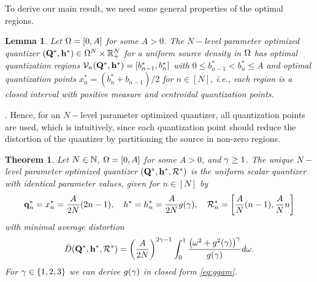 \documentclass[smallabstract,smallcaptions]{dccpaper}
\newtheorem{lemma}{Lemma}
\newtheorem{theorem}{Theorem}
\newif\ifarxiv\arxivfalse
\newenvironment{remark}{\par\vspace{1.5ex}\noindent{\em Remark\/}.}{\par\vspace{1.5ex}}
\renewcommand{\vp}{\mathbf q}
\renewcommand{\vP}{\mathbf Q}
\newcommand{\Vor}{\ensuremath{\mathcal{V}}}         %
\newcommand{\Rset}{\ensuremath{\mathcal R}}
\newcommand{\Dis}{\ensuremath{D}}                    %
\newcommand{\AvDis}{\ensuremath{\bar{\Dis}}}         %
\newcommand{\philippstart}{\color{black}}
\begin{document}
\newcommand{\pGlob}{\ensuremath{x^{*}}}
\newcommand{\hGlob}{\ensuremath{h^{*}}}
\newcommand{\qGlob}{\ensuremath{{\mathbf q}^{*}}}
\newcommand{\qLoc}{\ensuremath{{\mathbf q}^{*}}}
%
%
\philippstart
%
%
\color{black}
To derive our main result, we need some general properties of the optimal regions. 
%
\philippstart
%
\begin{lemma}\label{lemma:allActive}
  Let $\Omega=[0,A]$ for some $A>0$. The $N-$level parameter optimized quantizer $(\vP^*,\vh^*)\in\Ome^N\times\R_+^N$ for a
  uniform source density in $\Omega$ has optimal quantization regions $\Vor_n(\vP^*,\vh^*)=[b^*_{n-1},b^*_n]$ with $0\leq
  b^*_{n-1}<b^*_n\leq A$ and optimal quantization points $x_n^*=(b_n^*+b_{n-1})/2$ for $n\in[N]$, i.e., each region
  is a closed interval with positive measure and centroidal quantization points.
\end{lemma}
%
\ifarxiv
\begin{proof}
  See \appref{app:proof_lemma_active}.
\end{proof}
\fi
\begin{remark}
  Hence, for an $N-$level parameter optimized quantizer, all quantization points are used, which is intuitively, since
  each quantization point should reduce the distortion of the quantizer by partitioning the source in non-zero regions. 
\end{remark}
%
%
\begin{theorem}\label{thm:commonheight}
  Let $N\in{\ensuremath{\mathbb N}}$,  $\Omega=[0,A]$ for some $A>0$, and $\gamma\geq 1$. The \emph{unique $N-$level parameter optimized quantizer} 
  $(\vP^*,\vh^*,\Rset^*)$ is the  uniform scalar quantizer with identical parameter values, given for $n\in[N]$  by   
  \begin{align}
    \vp_n^*=\pGlob_n= \frac{A}{2N} (2n-1),\quad   h^*=h_n^*= \frac{A}{2N} g(\gam),\quad \Rset_n^*=
    \left[\frac{A}{N}(n-1),\frac{A}{N}n\right]
    \label{eq:optimaldeploy} 
  \end{align}
  with minimal average distortion
  \begin{align}
   \AvDis(\vP^*,\vh^*,\Rset^*)=\left(\frac{A}{2N}\right)^{2\gam-1}  \int_0^1 \frac{\big(\ome^2+g^2(\gam)\big)^{\gam}}{g(\gam)}
    d\ome\label{eq:optimumavpow}.
  \end{align}
  For $\gamma\in\{1,2,3\}$ we can derive $g(\gamma)$ in closed form  \eqref{eq:ggam}.
\end{theorem}
%

\ifarxiv
\begin{proof} See \appref{sec:proof_theorem}.
\end{proof}
\fi %
\color{black}
\end{document}
